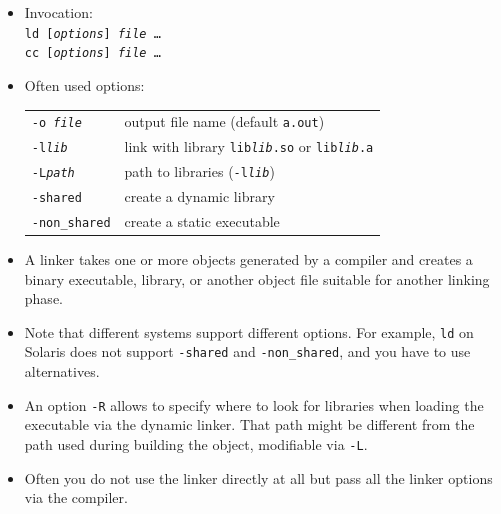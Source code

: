 \begin{slide}
\begin{itemize}
\item Invocation:\\
\texttt{ld [\emph{options}] \emph{file} \dots}\\
\texttt{cc [\emph{options}] \emph{file} \dots}
\item Often used options:\\
\begin{tabular}{ll}
\texttt{-o \emph{file}} & output file name (default \texttt{a.out})\\
\texttt{-l\emph{lib}} & link with library \texttt{lib\emph{lib}.so} or
\texttt{lib\emph{lib}.a}\\ 
\texttt{-L\emph{path}} & path to libraries (\texttt{-l\emph{lib}})\\
\texttt{-shared} & create a dynamic library\\
\texttt{-non\_shared} & create a static executable
\end{tabular}
\end{itemize}
\end{slide}

\begin{itemize}
\item A linker takes one or more objects generated by a compiler and creates a
binary executable, library, or another object file suitable for another linking
phase.
\item Note that different systems support different options.  For example,
\texttt{ld} on Solaris does not support \texttt{-shared} and
\texttt{-non\_shared}, and you have to use alternatives.
\item An option \texttt{-R} allows to specify where to look for libraries when
loading the executable via the dynamic linker.  That path might be different
from the path used during building the object, modifiable via \texttt{-L}.
\item Often you do not use the linker directly at all but pass all the linker
options via the compiler.
\end{itemize}



